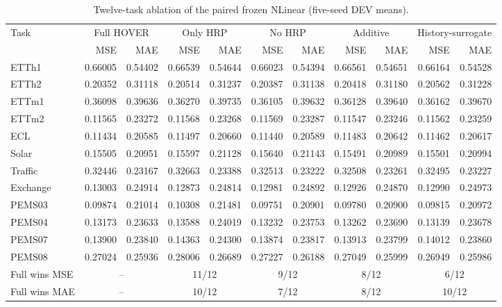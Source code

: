 \begin{table}[t]
\caption{Twelve-task ablation of the paired frozen NLinear (five-seed DEV means).}
\label{tab:ablation}
\centering
\begingroup
\setlength{\tabcolsep}{5.0pt}
\renewcommand{\arraystretch}{1.13}
\fontsize{8.0}{9.4}\selectfont
\begin{tabular*}{\textwidth}{@{\extracolsep{\fill}}l|rr|rr|rr|rr|rr@{}}
\toprule
Task & \multicolumn{2}{c|}{Full HOVER} & \multicolumn{2}{c|}{Only HRP} & \multicolumn{2}{c|}{No HRP} & \multicolumn{2}{c|}{Additive} & \multicolumn{2}{c}{History-surrogate} \\
\cmidrule(lr){2-3}\cmidrule(lr){4-5}\cmidrule(lr){6-7}\cmidrule(lr){8-9}\cmidrule(lr){10-11}
 & MSE & MAE & MSE & MAE & MSE & MAE & MSE & MAE & MSE & MAE \\
\midrule
ETTh1 & 0.66005 & 0.54402 & 0.66539 & 0.54644 & 0.66023 & 0.54394 & 0.66561 & 0.54651 & 0.66164 & 0.54528 \\
ETTh2 & 0.20352 & 0.31118 & 0.20514 & 0.31237 & 0.20387 & 0.31138 & 0.20418 & 0.31180 & 0.20562 & 0.31228 \\
ETTm1 & 0.36098 & 0.39636 & 0.36270 & 0.39735 & 0.36105 & 0.39632 & 0.36128 & 0.39640 & 0.36162 & 0.39670 \\
ETTm2 & 0.11565 & 0.23272 & 0.11568 & 0.23268 & 0.11569 & 0.23287 & 0.11547 & 0.23246 & 0.11562 & 0.23259 \\
\addlinespace[2pt]
ECL & 0.11434 & 0.20585 & 0.11497 & 0.20660 & 0.11440 & 0.20589 & 0.11483 & 0.20642 & 0.11462 & 0.20617 \\
Solar & 0.15505 & 0.20951 & 0.15597 & 0.21128 & 0.15640 & 0.21143 & 0.15491 & 0.20989 & 0.15501 & 0.20994 \\
Traffic & 0.32446 & 0.23167 & 0.32663 & 0.23388 & 0.32513 & 0.23222 & 0.32508 & 0.23261 & 0.32495 & 0.23227 \\
Exchange & 0.13003 & 0.24914 & 0.12873 & 0.24814 & 0.12981 & 0.24892 & 0.12926 & 0.24870 & 0.12990 & 0.24973 \\
\addlinespace[2pt]
PEMS03 & 0.09874 & 0.21014 & 0.10308 & 0.21481 & 0.09751 & 0.20901 & 0.09780 & 0.20900 & 0.09815 & 0.20972 \\
PEMS04 & 0.13173 & 0.23633 & 0.13588 & 0.24019 & 0.13232 & 0.23753 & 0.13262 & 0.23690 & 0.13139 & 0.23678 \\
PEMS07 & 0.13900 & 0.23840 & 0.14363 & 0.24300 & 0.13874 & 0.23817 & 0.13913 & 0.23799 & 0.14012 & 0.23860 \\
PEMS08 & 0.27024 & 0.25936 & 0.28006 & 0.26689 & 0.27227 & 0.26188 & 0.27049 & 0.25999 & 0.26949 & 0.25986 \\
\midrule
Full wins MSE & \multicolumn{2}{c|}{--} & \multicolumn{2}{c|}{11/12} & \multicolumn{2}{c|}{9/12} & \multicolumn{2}{c|}{8/12} & \multicolumn{2}{c}{6/12} \\
Full wins MAE & \multicolumn{2}{c|}{--} & \multicolumn{2}{c|}{10/12} & \multicolumn{2}{c|}{7/12} & \multicolumn{2}{c|}{8/12} & \multicolumn{2}{c}{10/12} \\
\bottomrule
\end{tabular*}
\endgroup
\end{table}
